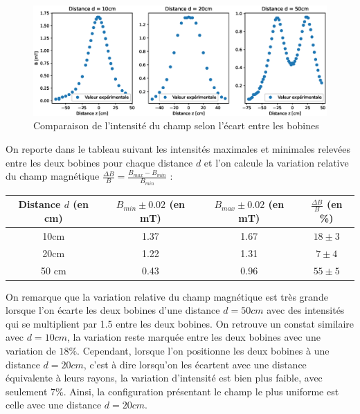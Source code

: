 \documentclass[12pt]{article}
\begin{document}
\begin{figure}[h!]
    \begin{center}
        \includegraphics[scale=0.6]{img/ChampDistance.eps}
    \end{center}
    \caption{Comparaison de l'intensité du champ selon l'écart entre les bobines}
\end{figure}

On reporte dans le tableau suivant les intensités maximales et minimales relevées entre les deux bobines pour chaque distance $d$ et l'on calcule la variation relative du champ magnétique
$\frac{\Delta B}{B} = \frac{B_{max} - B_{min}}{B_{min}}$ :

\begin{table}[h!]
    \begin{center}
        \begin{tabular}{c|c|c|c}
            Distance $d$ (en cm) & $B_{min} \pm 0.02$ (en mT) & $B_{max} \pm 0.02$ (en mT) & $\frac{\Delta B}{B}$ (en \%) \\ \hline
            10cm & 1.37 & 1.67 & $18 \pm 3$ \\
            20cm & 1.22 & 1.31 & $7 \pm 4$ \\
            50 cm & 0.43 & 0.96 & $55 \pm 5$ \\
        \end{tabular}
    \end{center}
\end{table}

On remarque que la variation relative du champ magnétique est très grande lorsque l'on écarte les deux bobines d'une distance $d=50cm$ avec des intensités qui se multiplient par 1.5 entre les deux bobines. 
On retrouve un constat similaire avec $d=10cm$, la variation reste marquée entre les deux bobines avec une variation de $18\%$. Cependant, lorsque l'on positionne les deux bobines à une distance $d = 20cm$,
c'est à dire lorsqu'on les écartent avec une distance équivalente à leurs rayons, la variation d'intensité est bien plus faible, avec seulement 7\%. Ainsi, la configuration présentant 
le champ le plus uniforme est celle avec une distance $d=20cm$.
\end{document}
